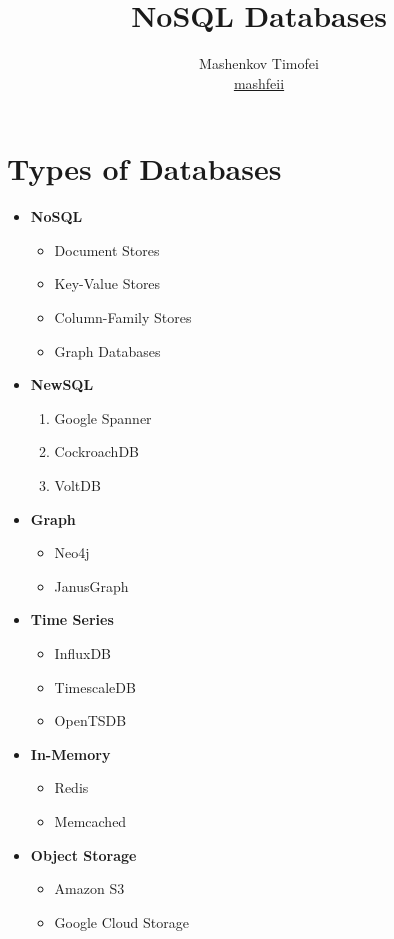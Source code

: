 \documentclass{article}
\title{NoSQL Databases}
\author{Mashenkov Timofei \\ \href{t.me/mashfeii}{mashfeii}}
\begin{document}
\maketitle{}

\section{Types of Databases}
\noindent

\begin{itemize}
  \item \textbf{NoSQL}
    \begin{itemize}
      \item Document Stores
      \item Key-Value Stores
      \item Column-Family Stores
      \item Graph Databases
    \end{itemize}
  \item \textbf{NewSQL}
    \begin{enumerate}
      \item Google Spanner
      \item CockroachDB
      \item VoltDB
    \end{enumerate}
  \item \textbf{Graph}
    \begin{itemize}
      \item Neo4j
      \item JanusGraph
    \end{itemize}
  \item \textbf{Time Series}
    \begin{itemize}
      \item InfluxDB
      \item TimescaleDB
      \item OpenTSDB
    \end{itemize}
  \item \textbf{In-Memory}
    \begin{itemize}
      \item Redis
      \item Memcached
    \end{itemize}
  \item \textbf{Object Storage} 
    \begin{itemize}
      \item Amazon S3
      \item Google Cloud Storage
    \end{itemize}
\end{itemize}
\end{document}
